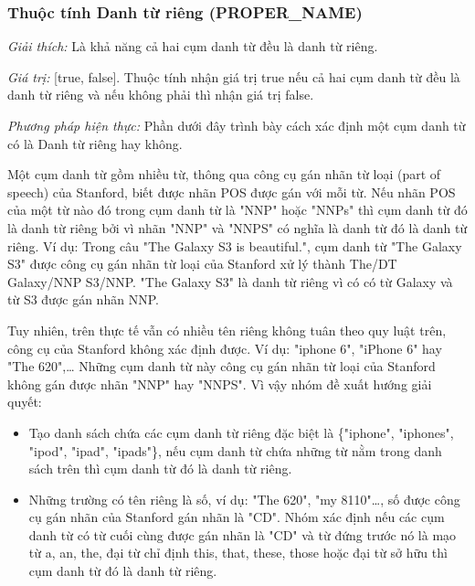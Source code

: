 \documentclass[12pt]{extarticle}
\begin{document}
			\subsubsection*{Thuộc tính Danh từ riêng (PROPER\_NAME)}
				\par \textit{Giải thích:} Là khả năng cả hai cụm danh từ đều là danh từ riêng.
				\par \textit{Giá trị:} [true, false]. Thuộc tính nhận giá trị true nếu cả hai cụm danh từ đều là danh từ riêng và nếu không phải thì nhận giá trị false.
				\par \textit{Phương pháp hiện thực:} Phần dưới đây trình bày cách xác định một cụm danh từ có là Danh từ riêng hay không.				
				\par Một cụm danh từ gồm nhiều từ, thông qua công cụ gán nhãn từ loại (part of speech) của Stanford, biết được nhãn POS được gán với mỗi từ. Nếu nhãn POS của  một từ nào đó trong cụm danh từ là "NNP" hoặc "NNPs" thì cụm danh từ đó là danh từ riêng bởi vì nhãn "NNP" và "NNPS" có nghĩa là danh từ đó là danh từ riêng. Ví dụ: Trong câu "The Galaxy S3 is beautiful.", cụm danh từ "The Galaxy S3" được công cụ gán nhãn từ loại của Stanford  xử lý thành The/DT Galaxy/NNP S3/NNP. "The Galaxy S3" là danh từ riêng vì có có từ Galaxy và từ S3 được gán nhãn NNP.
				\par Tuy nhiên, trên thực tế vẫn có nhiều tên riêng không tuân theo quy luật trên, công cụ của Stanford không xác định được. Ví dụ: "iphone 6", "iPhone 6" hay "The 620",… Những cụm danh từ này công cụ gán nhãn từ loại của Stanford không gán được nhãn "NNP" hay "NNPS". Vì vậy nhóm đề xuất hướng giải quyết:
				\begin{itemize}
					\item{Tạo danh sách chứa các cụm danh từ riêng đặc biệt là \{"iphone", "iphones", "ipod", "ipad", "ipads"\}, nếu cụm danh từ chứa những từ nằm trong danh sách trên thì cụm danh từ đó là danh từ riêng.}
					\item{Những trường có tên riêng là số, ví dụ: "The 620", "my 8110"…, số được công cụ gán nhãn của Stanford gán nhãn là "CD". Nhóm xác định nếu các cụm danh từ có từ cuối cùng được gán nhãn là "CD" và từ đứng trước nó là mạo từ {a, an, the}, đại từ chỉ định {this, that, these, those} hoặc đại từ sở hữu thì cụm danh từ đó là danh từ riêng.}
				\end{itemize}
\end{document}
